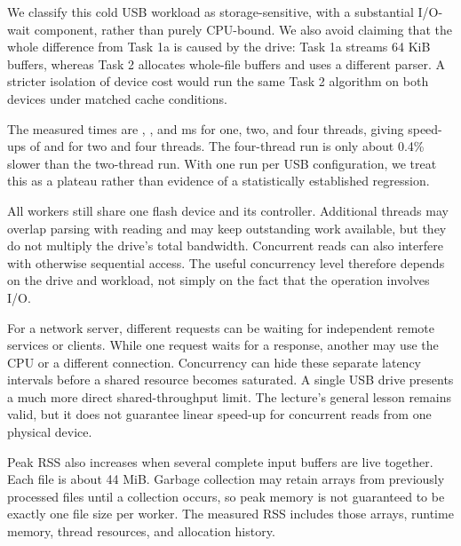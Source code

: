 We classify this cold USB workload as storage-sensitive, with a substantial I/O-wait component, rather than purely CPU-bound. We also avoid claiming that the whole difference from Task 1a is caused by the drive: Task 1a streams 64 KiB buffers, whereas Task 2 allocates whole-file buffers and uses a different parser. A stricter isolation of device cost would run the same Task 2 algorithm on both devices under matched cache conditions.

The measured times are \USBOneMs{}, \USBTwoMs{}, and \USBFourMs{} ms for one, two, and four threads, giving speed-ups of \USBSpeedTwo{} and \USBSpeedFour{} for two and four threads. \USBScalingInterpretation{} The four-thread run is only about 0.4\% slower than the two-thread run. With one run per USB configuration, we treat this as a plateau rather than evidence of a statistically established regression.

All workers still share one flash device and its controller. Additional threads may overlap parsing with reading and may keep outstanding work available, but they do not multiply the drive's total bandwidth. Concurrent reads can also interfere with otherwise sequential access. The useful concurrency level therefore depends on the drive and workload, not simply on the fact that the operation involves I/O.

For a network server, different requests can be waiting for independent remote services or clients. While one request waits for a response, another may use the CPU or a different connection. Concurrency can hide these separate latency intervals before a shared resource becomes saturated. A single USB drive presents a much more direct shared-throughput limit. The lecture's general lesson remains valid, but it does not guarantee linear speed-up for concurrent reads from one physical device.

Peak RSS also increases when several complete input buffers are live together. Each file is about 44 MiB. Garbage collection may retain arrays from previously processed files until a collection occurs, so peak memory is not guaranteed to be exactly one file size per worker. The measured RSS includes those arrays, runtime memory, thread resources, and allocation history.
